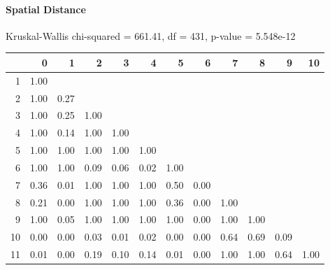 \paragraph{Spatial Distance}
Kruskal-Wallis chi-squared = 661.41, df = 431, p-value = 5.548e-12

% 
\begin{tabular}{rrrrrrrrrrrr}
  \hline
 & 0 & 1 & 2 & 3 & 4 & 5 & 6 & 7 & 8 & 9 & 10 \\ 
  \hline
1 & 1.00 &  &  &  &  &  &  &  &  &  &  \\ 
  2 & 1.00 & 0.27 &  &  &  &  &  &  &  &  &  \\ 
  3 & 1.00 & 0.25 & 1.00 &  &  &  &  &  &  &  &  \\ 
  4 & 1.00 & 0.14 & 1.00 & 1.00 &  &  &  &  &  &  &  \\ 
  5 & 1.00 & 1.00 & 1.00 & 1.00 & 1.00 &  &  &  &  &  &  \\ 
  6 & 1.00 & 1.00 & 0.09 & 0.06 & 0.02 & 1.00 &  &  &  &  &  \\ 
  7 & 0.36 & 0.01 & 1.00 & 1.00 & 1.00 & 0.50 & 0.00 &  &  &  &  \\ 
  8 & 0.21 & 0.00 & 1.00 & 1.00 & 1.00 & 0.36 & 0.00 & 1.00 &  &  &  \\ 
  9 & 1.00 & 0.05 & 1.00 & 1.00 & 1.00 & 1.00 & 0.00 & 1.00 & 1.00 &  &  \\ 
  10 & 0.00 & 0.00 & 0.03 & 0.01 & 0.02 & 0.00 & 0.00 & 0.64 & 0.69 & 0.09 &  \\ 
  11 & 0.01 & 0.00 & 0.19 & 0.10 & 0.14 & 0.01 & 0.00 & 1.00 & 1.00 & 0.64 & 1.00 \\ 
   \hline
\end{tabular}
% 
